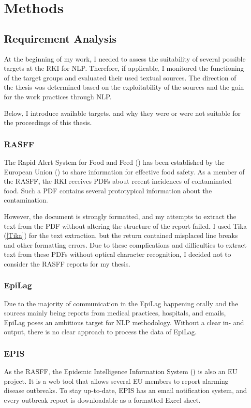 \chapter{Methods}

\section{Requirement Analysis}
  At the beginning of my work, I needed to assess the suitability of several possible targets at the RKI for NLP.
  Therefore, if applicable, I monitored the functioning of the target groups and evaluated their used textual sources.
  The direction of the thesis was determined based on the exploitability of the sources and the gain for the work practices through NLP.

  Below, I introduce available targets, and why they were or were not suitable for the proceedings of this thesis.

\subsection{RASFF}
  The Rapid Alert System for Food and Feed () has been established by the European Union () to share information for effective food safety.
  As a member of the RASFF, the RKI receives PDFs about recent incidences of contaminated food.
  Such a PDF contains several prototypical information about the contamination.

  However, the document is strongly formatted, and my attempts to extract the text from the PDF without altering the structure of the report failed.
  I used Tika (\ref{Tika}) for the text extraction, but the return contained misplaced line breaks and other formatting errors.
  Due to these complications and difficulties to extract text from these PDFs without optical character recognition, I decided not to consider the RASFF reports for my thesis.

\subsection{EpiLag}
  Due to the majority of communication in the EpiLag happening orally and the sources mainly being reports from medical practices, hospitals, and emails, EpiLag poses an ambitious target for NLP methodology.
  Without a clear in- and output, there is no clear approach to process the data of EpiLag.

\subsection{EPIS}
  As the RASFF, the Epidemic Intelligence Information System () is also an EU project.
  It is a web tool that allows several EU members to report alarming disease outbreaks.
  To stay up-to-date, EPIS has an email notification system, and every outbreak report is downloadable as a formatted Excel sheet.

